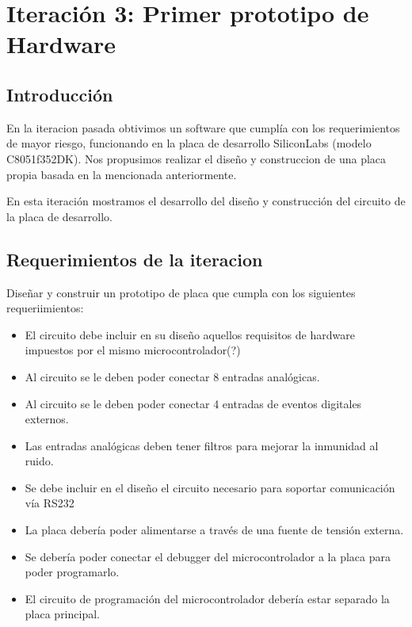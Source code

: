 \chapter{Iteración 3: Primer prototipo de Hardware} %
\label{cha:iteracion_3}


\section{Introducción} %
\label{sec:introduccion}

En la iteracion pasada obtivimos un software que cumplía con los requerimientos de mayor riesgo, funcionando en la placa de desarrollo SiliconLabs (modelo C8051f352DK). Nos propusimos realizar el diseño y construccion de una placa propia basada en la mencionada anteriormente.

En esta iteración mostramos el desarrollo del diseño y construcción del circuito de la placa de desarrollo.




\section{Requerimientos de la iteracion} %
\label{sec:requerimientos_de_la_iteracion}

Diseñar y construir un prototipo de placa que cumpla con los siguientes requeriimientos:

\begin{itemize}
\item El circuito debe incluir en su diseño aquellos requisitos de hardware impuestos por el mismo microcontrolador(?)
\item Al circuito se le deben poder conectar 8 entradas analógicas.
\item Al circuito se le deben poder conectar 4 entradas de eventos digitales externos.
\item Las entradas analógicas deben tener filtros para mejorar la inmunidad al ruido.
\item Se debe incluir en el diseño el circuito necesario para soportar comunicación vía RS232
\item La placa debería poder alimentarse a través de una fuente de tensión externa.
\item Se debería poder conectar el debugger del microcontrolador a la placa para poder programarlo.
\item El circuito de programación del microcontrolador debería estar separado la placa principal.
\end{itemize}


